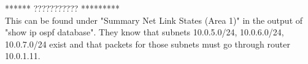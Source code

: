 ****** ??????????? ********* \\
This can be found under "Summary Net Link States (Area 1)" in the output of "show ip ospf database".
They know that subnets 10.0.5.0/24, 10.0.6.0/24, 10.0.7.0/24 exist and that packets for those subnets must go through router 10.0.1.11.

